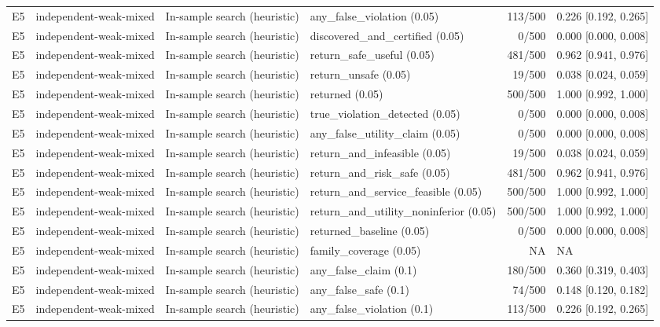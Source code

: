 \begin{longtable}{p{.04\linewidth}p{.18\linewidth}p{.19\linewidth}p{.16\linewidth}r p{.21\linewidth}}
E5 & independent-weak-mixed & In-sample search (heuristic) & any\_false\_violation (0.05) & 113/500 & 0.226 [0.192, 0.265]\\
E5 & independent-weak-mixed & In-sample search (heuristic) & discovered\_and\_certified (0.05) & 0/500 & 0.000 [0.000, 0.008]\\
E5 & independent-weak-mixed & In-sample search (heuristic) & return\_safe\_useful (0.05) & 481/500 & 0.962 [0.941, 0.976]\\
E5 & independent-weak-mixed & In-sample search (heuristic) & return\_unsafe (0.05) & 19/500 & 0.038 [0.024, 0.059]\\
E5 & independent-weak-mixed & In-sample search (heuristic) & returned (0.05) & 500/500 & 1.000 [0.992, 1.000]\\
E5 & independent-weak-mixed & In-sample search (heuristic) & true\_violation\_detected (0.05) & 0/500 & 0.000 [0.000, 0.008]\\
E5 & independent-weak-mixed & In-sample search (heuristic) & any\_false\_utility\_claim (0.05) & 0/500 & 0.000 [0.000, 0.008]\\
E5 & independent-weak-mixed & In-sample search (heuristic) & return\_and\_infeasible (0.05) & 19/500 & 0.038 [0.024, 0.059]\\
E5 & independent-weak-mixed & In-sample search (heuristic) & return\_and\_risk\_safe (0.05) & 481/500 & 0.962 [0.941, 0.976]\\
E5 & independent-weak-mixed & In-sample search (heuristic) & return\_and\_service\_feasible (0.05) & 500/500 & 1.000 [0.992, 1.000]\\
E5 & independent-weak-mixed & In-sample search (heuristic) & return\_and\_utility\_noninferior (0.05) & 500/500 & 1.000 [0.992, 1.000]\\
E5 & independent-weak-mixed & In-sample search (heuristic) & returned\_baseline (0.05) & 0/500 & 0.000 [0.000, 0.008]\\
E5 & independent-weak-mixed & In-sample search (heuristic) & family\_coverage (0.05) & NA & NA\\
E5 & independent-weak-mixed & In-sample search (heuristic) & any\_false\_claim (0.1) & 180/500 & 0.360 [0.319, 0.403]\\
E5 & independent-weak-mixed & In-sample search (heuristic) & any\_false\_safe (0.1) & 74/500 & 0.148 [0.120, 0.182]\\
E5 & independent-weak-mixed & In-sample search (heuristic) & any\_false\_violation (0.1) & 113/500 & 0.226 [0.192, 0.265]\\

\end{longtable}
